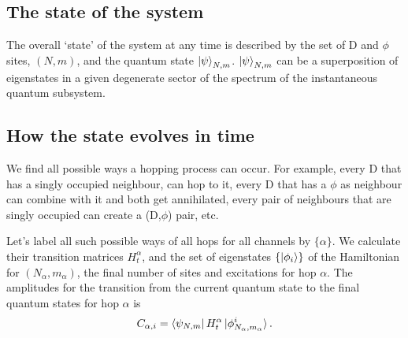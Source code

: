 \documentclass[a4paper,twocolumn]{revtex4-1} %
\begin{document}

\subsection{The state of the system}
The overall `state' of the system
at any time is described by
the set of D and $\phi$ sites,
$(N,m)$, and the quantum state $\ket{\psi}_{N,m}$.
$\ket{\psi}_{N,m}$ can be a superposition of eigenstates in a given degenerate sector of the spectrum of the instantaneous quantum subsystem.

\subsection{How the state evolves in time}
We find all possible ways a hopping process can occur. 
For example, every D that has a singly occupied neighbour, can hop to it, every D that has a $\phi$ as neighbour can combine with it and both get annihilated, every pair of neighbours that are singly occupied can create a (D,$\phi$) pair, etc.

Let's label all such possible ways of all hops for all channels 
by $\{\alpha\}$.
We calculate their transition matrices $H_t^{\alpha}$,
and %
the set of eigenstates $\{ \ket{\phi_i} \}$ of 
the Hamiltonian
  for $(N_{\alpha},m_{\alpha})$, the final number of sites and 
  excitations for hop $\alpha$.
  The amplitudes for the transition from 
  the current quantum state to the
  final quantum states for hop $\alpha$
  is 
\begin{gather}
  C_{\alpha,i} = \bra{\psi_{N,m}}H_t^{\alpha}\ket{\phi_{N_{\alpha},m_{\alpha}}^i}.
\end{gather}
\end{document}

